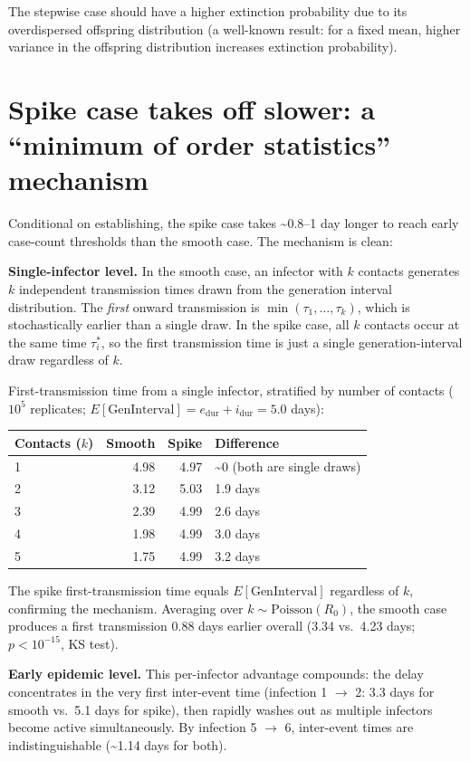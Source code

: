 \documentclass[11pt]{article}
\begin{document}
The stepwise case should have a higher extinction probability due to its overdispersed offspring distribution (a well-known result: for a fixed mean, higher variance in the offspring distribution increases extinction probability).

\section{Spike case takes off slower: a ``minimum of order statistics'' mechanism}

Conditional on establishing, the spike case takes \textasciitilde0.8--1 day longer to reach early case-count thresholds than the smooth case. The mechanism is clean:

\textbf{Single-infector level.} In the smooth case, an infector with $k$ contacts generates $k$ independent transmission times drawn from the generation interval distribution. The \textit{first} onward transmission is $\min(\tau_1, \ldots, \tau_k)$, which is stochastically earlier than a single draw. In the spike case, all $k$ contacts occur at the same time $\tau_i^*$, so the first transmission time is just a single generation-interval draw regardless of $k$.

First-transmission time from a single infector, stratified by number of contacts ($10^5$ replicates; $E[\text{GenInterval}] = e_{\text{dur}} + i_{\text{dur}} = 5.0$ days):

\medskip
\begin{tabular}{lrrl}
\toprule
Contacts ($k$) & Smooth & Spike & Difference \\
\midrule
1 & 4.98 & 4.97 & \textasciitilde0 (both are single draws) \\
2 & 3.12 & 5.03 & 1.9 days \\
3 & 2.39 & 4.99 & 2.6 days \\
4 & 1.98 & 4.99 & 3.0 days \\
5 & 1.75 & 4.99 & 3.2 days \\
\bottomrule
\end{tabular}
\medskip

The spike first-transmission time equals $E[\text{GenInterval}]$ regardless of $k$, confirming the mechanism. Averaging over $k \sim \text{Poisson}(R_0)$, the smooth case produces a first transmission 0.88 days earlier overall (3.34 vs.\ 4.23 days; $p < 10^{-15}$, KS test).

\textbf{Early epidemic level.} This per-infector advantage compounds: the delay concentrates in the very first inter-event time (infection 1 $\to$ 2: 3.3 days for smooth vs.\ 5.1 days for spike), then rapidly washes out as multiple infectors become active simultaneously. By infection 5 $\to$ 6, inter-event times are indistinguishable (\textasciitilde1.14 days for both).
\end{document}

